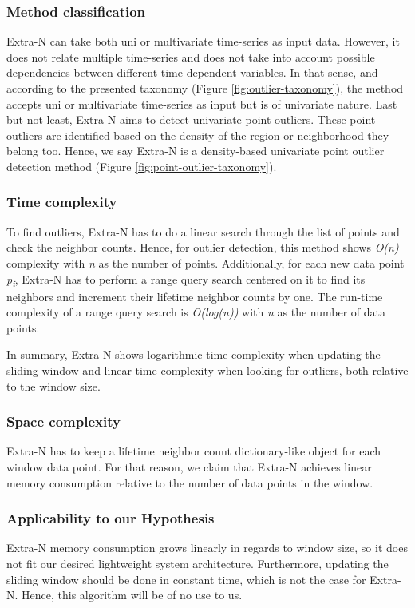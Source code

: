\subsubsection*{Method classification}
Extra-N can take both uni or multivariate time-series as input data. However, it does not relate multiple time-series and does not take into account possible dependencies between different time-dependent variables. In that sense, and according to the presented taxonomy (Figure \ref{fig:outlier-taxonomy}), the method accepts uni or multivariate time-series as input but is of univariate nature. Last but not least, Extra-N aims to detect univariate point outliers. These point outliers are identified based on the density of the region or neighborhood they belong too. Hence, we say Extra-N is a density-based univariate point outlier detection method (Figure \ref{fig:point-outlier-taxonomy}).

\subsubsection*{Time complexity}

To find outliers, Extra-N has to do a linear search through the list of points and check the neighbor counts. Hence, for outlier detection, this method shows \textit{O(n)} complexity with \textit{n} as the number of points. Additionally, for each new data point \textit{p\textsubscript{i}}, Extra-N has to perform a range query search centered on it to find its neighbors and increment their lifetime neighbor counts by one. The run-time complexity of a range query search is \textit{O(log(n))} \cite{range-query-log} with \textit{n} as the number of data points.

In summary, Extra-N shows logarithmic time complexity when updating the sliding window and linear time complexity when looking for outliers, both relative to the window size.


\subsubsection*{Space complexity}
Extra-N has to keep a lifetime neighbor count dictionary-like object for each window data point. For that reason, we claim that Extra-N achieves linear memory consumption relative to the number of data points in the window.

\subsubsection*{Applicability to our Hypothesis}
Extra-N memory consumption grows linearly in regards to window size, so it does not fit our desired lightweight system architecture. Furthermore, updating the sliding window should be done in constant time, which is not the case for Extra-N. Hence, this algorithm will be of no use to us.

